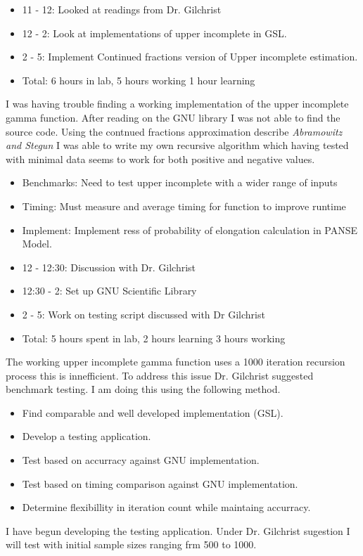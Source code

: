 \documentclass[12pt,hyperref]{labbook}
\begin{document}
\begin{itemize}
	\item 11 - 12: Looked at readings from Dr. Gilchrist
	\item 12 - 2: Look at implementations of upper incomplete in GSL.
	\item 2 - 5: Implement Continued fractions version of Upper incomplete estimation.
	\item Total: 6 hours in lab, 5 hours working 1 hour learning
\end{itemize}
I was having trouble finding a working implementation of the upper incomplete gamma function. After reading on the GNU library I was not able to find the source code. Using the contnued fractions approximation describe \textit{Abramowitz and Stegun} I was able to write my own recursive algorithm which having tested with minimal data seems to work for both positive and negative values.
\begin{itemize}
	\item Benchmarks: Need to test upper incomplete with a wider range of inputs
	\item Timing: Must measure and average timing for function to improve runtime
	\item Implement: Implement ress of probability of elongation calculation in PANSE Model.
\end{itemize}

\begin{itemize}
    \item 12 - 12:30: Discussion with Dr. Gilchrist
    \item 12:30 - 2: Set up GNU Scientific Library
    \item 2 - 5: Work on testing script discussed with Dr Gilchrist
    \item Total: 5 hours spent in lab, 2 hours learning 3 hours working
\end{itemize}
The working upper incomplete gamma function uses a 1000 iteration recursion process this is innefficient. To address this issue Dr. Gilchrist suggested benchmark testing. I am doing this using the following method.
\begin{itemize}
    \item Find comparable and well developed implementation (GSL).
    \item Develop a testing application.
    \item Test based on accurracy against GNU implementation.
    \item Test based on timing comparison against GNU implementation.
    \item Determine flexibillity in iteration count while maintaing accurracy.
\end{itemize}
I have begun developing the testing application. Under Dr. Gilchrist sugestion I will test with initial sample sizes ranging frm 500 to 1000.
\end{document}
